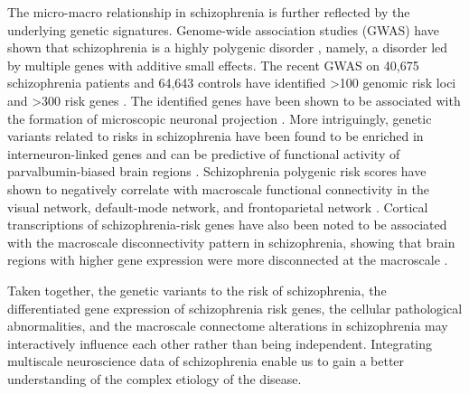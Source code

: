 \begin{refsection}
The micro-macro relationship in schizophrenia is further reflected by the underlying genetic signatures. Genome-wide association studies (GWAS) have shown that schizophrenia is a highly polygenic disorder \citep{Ripke2014BiologicalIF}, namely, a disorder led by multiple genes with additive small effects. The recent GWAS on 40,675 schizophrenia patients and 64,643 controls have identified >100 genomic risk loci and >300 risk genes \citep{Pardias2018CommonSA}. The identified genes have been shown to be associated with the formation of microscopic neuronal projection \citep{Pardias2018CommonSA}. More intriguingly, genetic variants related to risks in schizophrenia have been found to be enriched in interneuron-linked genes and can be predictive of functional activity of parvalbumin-biased brain regions \citep{Anderson2018TheTL}. Schizophrenia polygenic risk scores have shown to negatively correlate with macroscale functional connectivity in the visual network, default-mode network, and frontoparietal network \citep{Cao2020FunctionalCA}. Cortical transcriptions of schizophrenia-risk genes have also been noted to be associated with the macroscale disconnectivity pattern in schizophrenia, showing that brain regions with higher gene expression were more disconnected at the macroscale \citep{Romme2017ConnectomeDA}. 

Taken together, the genetic variants to the risk of schizophrenia, the differentiated gene expression of schizophrenia risk genes, the cellular pathological abnormalities, and the macroscale connectome alterations in schizophrenia may interactively influence each other rather than being independent. Integrating multiscale neuroscience data of schizophrenia enable us to gain a better understanding of the complex etiology of the disease.



\end{refsection}
